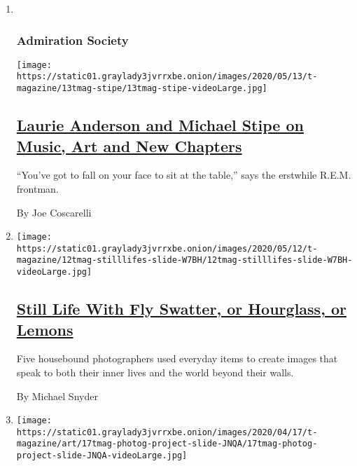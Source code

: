 \begin{enumerate}
\def\labelenumi{\arabic{enumi}.}
\item ~
  \hypertarget{admiration-society}{%
  \subsubsection{Admiration Society}\label{admiration-society}}

  \texttt{[image: https://static01.graylady3jvrrxbe.onion/images/2020/05/13/t-magazine/13tmag-stipe/13tmag-stipe-videoLarge.jpg]}

  \hypertarget{laurie-anderson-and-michael-stipe-on-music-art-and-new-chapters}{%
  \subsection{\texorpdfstring{\href{/2020/05/14/t-magazine/michael-stipe-laurie-anderson.html}{Laurie
  Anderson and Michael Stipe on Music, Art and New
  Chapters}}{Laurie Anderson and Michael Stipe on Music, Art and New Chapters}}\label{laurie-anderson-and-michael-stipe-on-music-art-and-new-chapters}}

  ``You've got to fall on your face to sit at the table,'' says the
  erstwhile R.E.M. frontman.

  By Joe Coscarelli
\item
  \texttt{[image: https://static01.graylady3jvrrxbe.onion/images/2020/05/12/t-magazine/12tmag-stilllifes-slide-W7BH/12tmag-stilllifes-slide-W7BH-videoLarge.jpg]}

  \hypertarget{still-life-with-fly-swatter-or-hourglass-or-lemons}{%
  \subsection{\texorpdfstring{\href{/2020/05/12/t-magazine/photographers-coronavirus-still-life-pictures.html}{Still
  Life With Fly Swatter, or Hourglass, or
  Lemons}}{Still Life With Fly Swatter, or Hourglass, or Lemons}}\label{still-life-with-fly-swatter-or-hourglass-or-lemons}}

  Five housebound photographers used everyday items to create images
  that speak to both their inner lives and the world beyond their walls.

  By Michael Snyder
\item
  \texttt{[image: https://static01.graylady3jvrrxbe.onion/images/2020/04/17/t-magazine/art/17tmag-photog-project-slide-JNQA/17tmag-photog-project-slide-JNQA-videoLarge.jpg]}


\end{enumerate}
